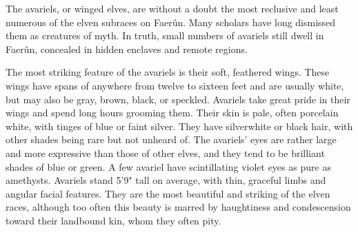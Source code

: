 
The avariels, or winged elves, are without a doubt the most reclusive and least numerous of the elven subraces on Faerûn. Many scholars have long dismissed them as creatures of myth. In truth, small numbers of avariels still dwell in Faerûn, concealed in hidden enclaves and remote regions.

The most striking feature of the avariels is their soft, feathered wings. These wings have spans of anywhere from twelve to sixteen feet and are usually white, but may also be gray, brown, black, or speckled. Avariels take great pride in their wings and spend long hours grooming them. Their skin is pale, often porcelain white, with tinges of blue or faint silver. They have silverwhite or black hair, with other shades being rare but not unheard of. The avariels’ eyes are rather large and more expressive than those of other elves, and they tend to be brilliant shades of blue or green. A few avariel have scintillating violet eyes as pure as amethysts. Avariels stand 5'9" tall on average, with thin, graceful limbs and angular facial features. They are the most beautiful and striking of the elven races, although too often this beauty is marred by haughtiness and condescension toward their landbound kin, whom they often pity.

